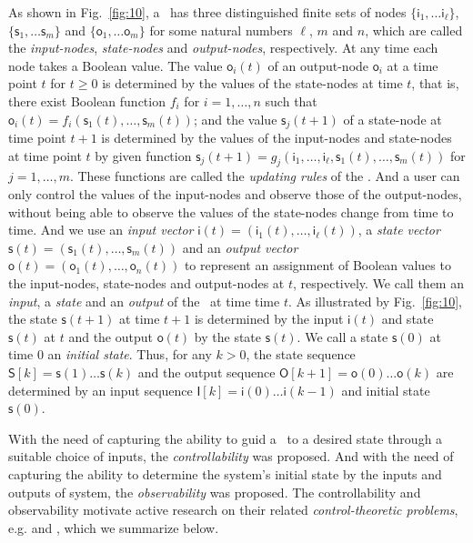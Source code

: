 As shown in Fig.~\ref{fig:10}, a \BCN\ has three distinguished finite sets of nodes $\{\mathsf{i}_1,\ldots\mathsf{i}_\ell\}$, $\{\mathsf{s}_1,\ldots\mathsf{s}_m\}$ and $\{\mathsf{o}_1,\ldots\mathsf{o}_m\}$ for some natural numbers $\ell$, $m$ and $n$, which are called the {\em input-nodes}, {\em state-nodes}  and {\em output-nodes}, respectively. At any time each node takes a Boolean value. The value $\mathsf{o}_i(t)$ of an output-node $\mathsf{o}_i$ at a time point $t$ for $t\ge0$ is determined by the values of the state-nodes at time $t$, that is, there exist Boolean function $f_i$ for $i=1,\ldots,n$ such that $\mathsf{o}_i(t)=f_i(\mathsf{s}_1(t),\ldots,\mathsf{s}_m(t))$; and the value $\mathsf{s}_j(t+1)$ of a state-node at time point $t+1$ is determined by the values of the input-nodes and state-nodes at time point $t$ by given function $\mathsf{s}_j(t+1)=g_j(\mathsf{i}_1,\ldots,\mathsf{i}_\ell,\mathsf{s}_1(t),\ldots,\mathsf{s}_m(t))$ for $j=1,\ldots,m$. These functions are called the {\em updating rules} of the \BCN. And a user can only control the  values of the input-nodes and observe those of the output-nodes, without being able to observe the values of the state-nodes change from time to time. And we use an {\em input vector} $\mathsf{i}(t)=(\mathsf{i}_1(t),\ldots,\mathsf{i}_\ell (t))$, a {\em state vector} $\mathsf{s}(t)=(\mathsf{s}_1(t), \ldots, \mathsf{s}_m(t))$ and an {\em output  vector} $\mathsf{o}(t)=(\mathsf{o}_1(t),\ldots, \mathsf{o}_n(t))$  to represent an assignment of Boolean values to the  input-nodes, state-nodes and  output-nodes at $t$, respectively.  We call them an {\em input}, a {\em state} and an {\em output} of the \BCN\ at time time $t$. As  illustrated by Fig.~\ref{fig:10},  the state $\mathsf{s}(t+1)$ at time $t+1$ is determined by the input   $\mathsf{i}(t)$ and state $\mathsf{s}(t)$ at $t$  and the output   $\mathsf{o}(t)$ by the state  $\mathsf{s}(t)$.  We call a state $\mathsf{s}(0)$ at time $0$ an {\em initial state}. Thus, for any $k>0$, the state sequence  $\mathsf{S}[k]=\mathsf{s}(1)\ldots\mathsf{s}(k)$ and the output sequence $\mathsf{O}[k+1]=\mathsf{o}(0)\ldots\mathsf{o}(k)$ are  determined by an  input sequence $\mathsf{I}[k]=\mathsf{i}(0)\ldots\mathsf{i}(k-1)$ and initial state $\mathsf{s}(0)$. 

With the need of capturing the ability to guid a \BCN\ to a desired state through a suitable choice of inputs, the {\em controllability} was proposed. And with the need of capturing the ability to determine the system's initial state by the inputs and outputs of system, the {\em observability}  was proposed. The controllability and observability motivate active research on their related {\em control-theoretic problems}, e.g.  \cite{cheng2009controllability, Zhao2010Input, Cheng2011Identification, Cheng2011Analysis} and \cite{Fornasini2013Observability}, which we summarize below.


